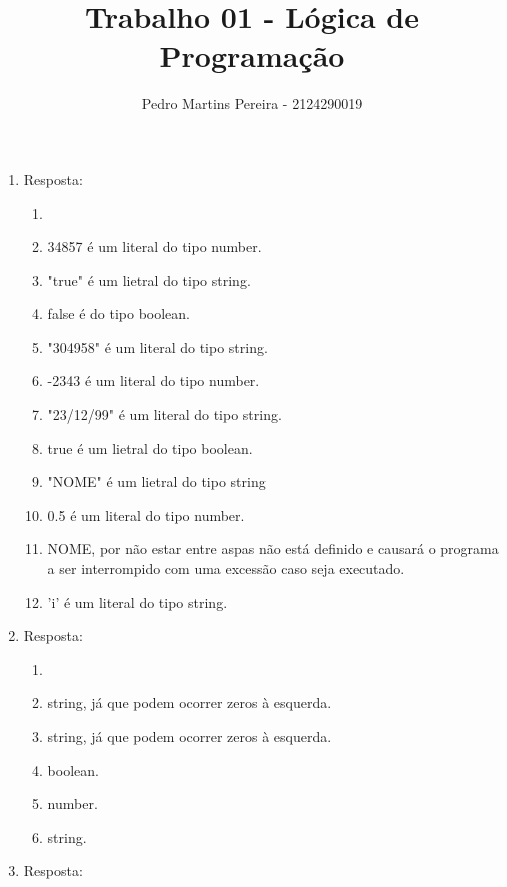 \documentclass[11pt]{article}
\date{}
\begin{document}
\author{Pedro Martins Pereira - 2124290019}
\title{Trabalho 01 - Lógica de Programação}
\maketitle

\medskip

\begin{enumerate}

\item
	

	Resposta:

	\begin{enumerate}[label=(\alph*)]
		\item \addtocounter{enumii}{0}
		\item 34857 é um literal do tipo number.
		\item "true" é um lietral do tipo string.
		\item false é do tipo boolean.
		\item "304958" é um literal do tipo string.
		\item -2343 é um literal do tipo number.
		\item "23/12/99" é um literal do tipo string. 		  \item true é um lietral do tipo boolean.
		\item "NOME" é um lietral do tipo string
		\item 0.5 é um literal do tipo number.
		\item NOME, por não estar entre aspas não está definido e causará o programa a ser interrompido com uma excessão caso seja executado. 
		\item 'i' é um literal do tipo string. 
  	\end{enumerate}

\item Resposta:

	\begin{enumerate}[label=(\alph*)]
		\item \addtocounter{enumii}{0}
		\item string, já que podem ocorrer zeros à esquerda.
		\item string, já que podem ocorrer zeros à esquerda. 
		\item boolean.
		\item number.
		\item string.
  	\end{enumerate}


\item Resposta:


\end{enumerate}
\end{document}
